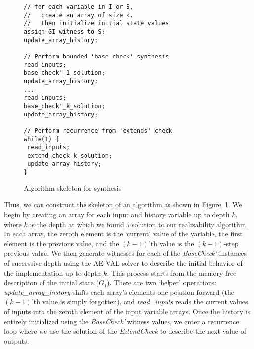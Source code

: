 \begin{figure}
\begin{small}
\begin{verbatim}
// for each variable in I or S,
//   create an array of size k.
//   then initialize initial state values
assign_GI_witness_to_S;
update_array_history;

// Perform bounded 'base check' synthesis
read_inputs;
base_check'_1_solution;
update_array_history;
...
read_inputs;
base_check'_k_solution;
update_array_history;

// Perform recurrence from 'extends' check
while(1) {
 read_inputs;
 extend_check_k_solution;
 update_array_history;
}
\end{verbatim}
\end{small}
\caption{Algorithm skeleton for synthesis}
\label{fig:algorithm}
\end{figure}

\noindent

Thus, we can construct the skeleton of an algorithm as shown in Figure~\ref{fig:algorithm}.  
We begin by creating an array for each input and history variable up to depth
$k$, where $k$ is the depth at which we found a solution to our realizability algorithm.
In each array, the zeroth element is the `current' value of the variable, the first element is the previous value, and the $(k-1)$'th value is the $(k-1)$-step previous value.
We then generate witnesses for each of the {\em BaseCheck'} instances of
successive depth using the AE-VAL solver to describe the initial behavior of the
implementation up to depth $k$.  This process starts from the memory-free
description of the initial state ($G_I$).  There are two `helper' operations:
{\em update\_array\_history} shifts each array's elements one position forward
(the $(k-1)$'th value is simply forgotten), and {\em read\_inputs} reads the current values of inputs into the zeroth element of the input variable arrays.  Once the history is entirely initialized using the {\em BaseCheck'} witness values, we enter a recurrence loop where we use the solution of the {\em ExtendCheck} to describe the next value of outputs.
 
\iffalse
Taking this query and providing it as a target formula for AE-VAL effectively
gives an answer to the synthesis problem in the form of a Skolem relation for
the candidate states that can further extend valid execution paths in the
system. In other words, the Skolem relation contains, starting from a valid
initial state of variables, strategies in terms of how the new state is
selected, in such a way, that the contract is not violated. This is particularly
interesting in our case since in the underlying machinery, each contract is
translated into an equivalent program in the Lustre specification language,
which explicitly defines expressions that dictate the way in which each variable
is expected to behave after a transition occurs to a new state. Therefore, a
final implementation is a simple Lustre program that--apart from the initial
state definitions--contains a set of expressions that depict the behavior of
each variable under a certain condition, in an equivalent manner to that
indicated by the Skolem relation.
\fi

